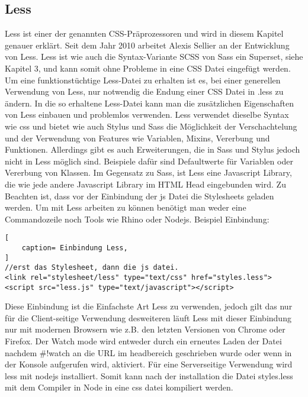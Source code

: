 \subsection{Less}
Less ist einer der genannten CSS-Präprozessoren und wird in diesem Kapitel genauer erklärt.\newline
Seit dem Jahr 2010 arbeitet Alexis Sellier an der Entwicklung von Less.\newline
Less ist wie auch die Syntax-Variante SCSS von Sass ein Superset, siehe Kapitel 3, und kann somit ohne Probleme in eine CSS Datei eingefügt werden. Um eine funktionstüchtige Less-Datei zu erhalten ist es, bei einer generellen Verwendung von Less, nur notwendig die Endung einer CSS Datei in .less zu ändern. In die so erhaltene Less-Datei kann man die zusätzlichen Eigenschaften von Less einbauen und problemlos verwenden. \newline
Less verwendet dieselbe Syntax wie css und bietet wie auch Stylus und Sass die Möglichkeit der Verschachtelung und der Verwendung von Features wie Variablen, Mixins, Vererbung und Funktionen.\newline
Allerdings gibt es auch Erweiterungen, die in Sass und Stylus jedoch nicht in Less möglich sind. Beispiele dafür sind Defaultwerte für Variablen oder Vererbung von Klassen.\newline
Im Gegensatz zu Sass, ist Less eine Javascript Library, die wie jede andere Javascript Library im HTML Head eingebunden wird. Zu Beachten ist, dass vor der Einbindung der js Datei die Stylesheets geladen werden. \newline
Um mit Less arbeiten zu können benötigt man weder eine Commandozeile noch Tools wie Rhino oder Nodejs.
Beispiel Einbindung:
\begin{lstlisting}[
	caption= Einbindung Less,
]
//erst das Stylesheet, dann die js datei.
<link rel="stylesheet/less" type="text/css" href="styles.less">
<script src="less.js" type="text/javascript"></script>    
\end{lstlisting}
Diese Einbindung ist die Einfachste Art Less zu verwenden, jedoch gilt das nur für die Client-seitige Verwendung desweiteren läuft Less mit dieser Einbindung nur mit modernen Browsern wie z.B. den letzten Versionen von Chrome oder Firefox.\newline
Der Watch mode wird entweder durch ein erneutes Laden der Datei nachdem \glqq\#!watch\grqq{} an die URL im headbereich geschrieben wurde oder wenn in der Konsole \grqq{}   aufgerufen wird, aktiviert.\newline
Für eine Serverseitige Verwendung wird less mit nodejs installiert. Somit kann nach der installation die Datei styles.less mit dem Compiler in Node in eine css datei kompiliert werden.\autocite[]{Sellier.2013}

